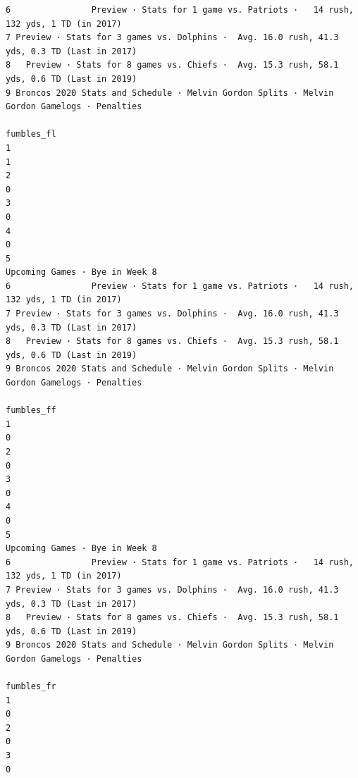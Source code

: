 \documentclass[
]{article}
\begin{document}
\begin{verbatim}
6                Preview · Stats for 1 game vs. Patriots ·   14 rush, 132 yds, 1 TD (in 2017)
7 Preview · Stats for 3 games vs. Dolphins ·  Avg. 16.0 rush, 41.3 yds, 0.3 TD (Last in 2017)
8   Preview · Stats for 8 games vs. Chiefs ·  Avg. 15.3 rush, 58.1 yds, 0.6 TD (Last in 2019)
9 Broncos 2020 Stats and Schedule · Melvin Gordon Splits · Melvin Gordon Gamelogs · Penalties
                                                                                   fumbles_fl
1                                                                                           1
2                                                                                           0
3                                                                                           0
4                                                                                           0
5                                                              Upcoming Games · Bye in Week 8
6                Preview · Stats for 1 game vs. Patriots ·   14 rush, 132 yds, 1 TD (in 2017)
7 Preview · Stats for 3 games vs. Dolphins ·  Avg. 16.0 rush, 41.3 yds, 0.3 TD (Last in 2017)
8   Preview · Stats for 8 games vs. Chiefs ·  Avg. 15.3 rush, 58.1 yds, 0.6 TD (Last in 2019)
9 Broncos 2020 Stats and Schedule · Melvin Gordon Splits · Melvin Gordon Gamelogs · Penalties
                                                                                   fumbles_ff
1                                                                                           0
2                                                                                           0
3                                                                                           0
4                                                                                           0
5                                                              Upcoming Games · Bye in Week 8
6                Preview · Stats for 1 game vs. Patriots ·   14 rush, 132 yds, 1 TD (in 2017)
7 Preview · Stats for 3 games vs. Dolphins ·  Avg. 16.0 rush, 41.3 yds, 0.3 TD (Last in 2017)
8   Preview · Stats for 8 games vs. Chiefs ·  Avg. 15.3 rush, 58.1 yds, 0.6 TD (Last in 2019)
9 Broncos 2020 Stats and Schedule · Melvin Gordon Splits · Melvin Gordon Gamelogs · Penalties
                                                                                   fumbles_fr
1                                                                                           0
2                                                                                           0
3                                                                                           0

\end{verbatim}
\end{document}
